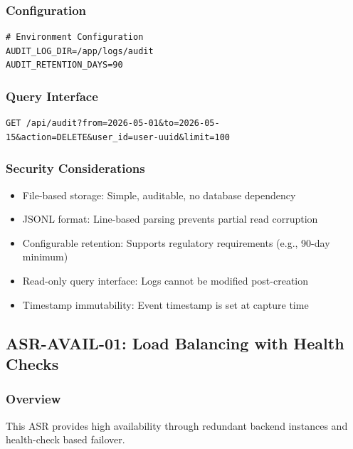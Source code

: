 \documentclass[12pt,oneside,a4paper]{article}
\begin{document}
\subsubsection{Configuration}
\begin{lstlisting}
# Environment Configuration
AUDIT_LOG_DIR=/app/logs/audit
AUDIT_RETENTION_DAYS=90
\end{lstlisting}

\subsubsection{Query Interface}
\begin{lstlisting}
GET /api/audit?from=2026-05-01&to=2026-05-15&action=DELETE&user_id=user-uuid&limit=100
\end{lstlisting}

\subsubsection{Security Considerations}
\begin{itemize}
    \item File-based storage: Simple, auditable, no database dependency
    \item JSONL format: Line-based parsing prevents partial read corruption
    \item Configurable retention: Supports regulatory requirements (e.g., 90-day minimum)
    \item Read-only query interface: Logs cannot be modified post-creation
    \item Timestamp immutability: Event timestamp is set at capture time
\end{itemize}

\subsection{ASR-AVAIL-01: Load Balancing with Health Checks}

\subsubsection{Overview}
This ASR provides high availability through redundant backend instances and health-check based failover.
\end{document}
